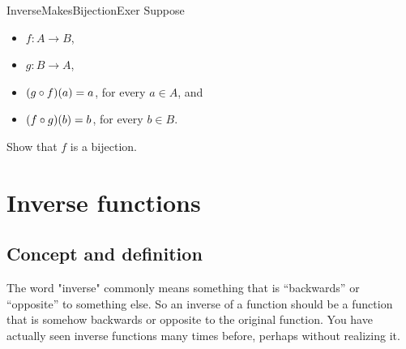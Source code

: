 

 \begin{exercise}{InverseMakesBijectionExer}
 Suppose 
 \begin{itemize}
 \item $f \colon A \to B$,
 \item  $g \colon B \to A$,
 \item $(g \circ f)(a) = a$, for every $a \in A$,
 and
 \item $(f \circ g)(b) = b$, for every $b \in B$.
 \end{itemize}
 Show that $f$ is a bijection.
 \end{exercise}
  



 
 \section{Inverse functions}


\subsection{Concept and definition}

\medskip\noindent
The word "inverse" commonly means something that is ``backwards'' or ``opposite'' to something else.  So an inverse of a function should be  a function that is somehow backwards or opposite to the original  function.  
You have actually seen inverse functions many times before, perhaps without realizing it.

